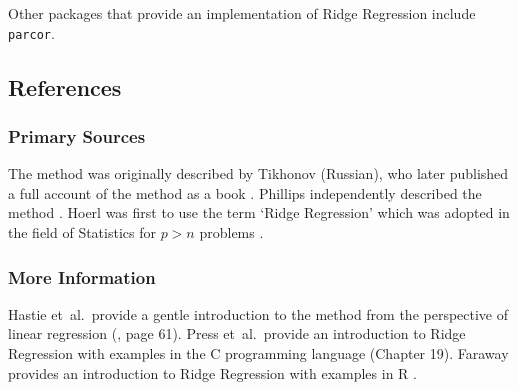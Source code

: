 Other packages that provide an implementation of Ridge Regression include \texttt{parcor}.

\subsection{References}

\subsubsection{Primary Sources}
The method was originally described by Tikhonov \cite{Tikhonov1943, Tikhonov1963} (Russian), who later published a full account of the method as a book \cite{Tikhonov1977}.
Phillips independently described the method \cite{Phillips1962}. Hoerl was first to use the term `Ridge Regression' which was adopted in the field of Statistics for $p>n$ problems \cite{Hoerl1962, Hoerl1970, Hoerl1970a}.

\subsubsection{More Information}
Hastie et~al.\ provide a gentle introduction to the method from the perspective of linear regression (\cite{Hastie2009}, page 61).
Press et~al.\ provide an introduction to Ridge Regression with examples in the C programming language \cite{Press2007} (Chapter 19).
Faraway provides an introduction to Ridge Regression with examples in R \cite{Faraway2002}.

